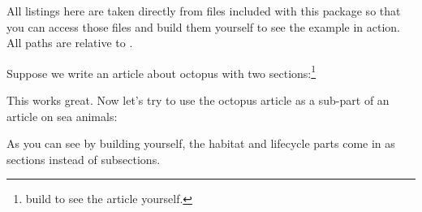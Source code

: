 
All listings here are taken directly from files included with this package so that you can access those files and build them yourself to see the example in action.
All paths are relative to .

Suppose we write an article about octopus with two sections:\footnote{build  to see the article yourself.}








This works great.
Now let's try to use the octopus article as a sub-part of an article on sea animals:


As you can see by building  yourself, the habitat and lifecycle parts come in as sections instead of subsections.

